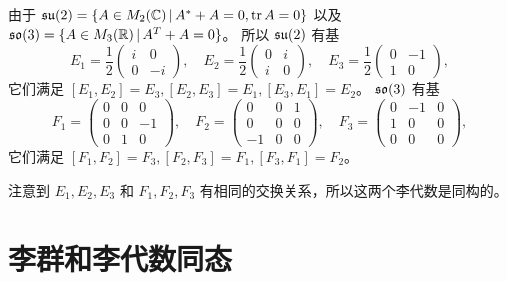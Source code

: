 \begin{example}\label{exa:base of su2 and so3}
  由于 $\mathfrak{su}(2)=\{A\in M_2(\mathbb C)\,|\, A^*+A=0,\operatorname{tr} A=0\}$
  以及 $\mathfrak{so}(3)=\{A\in M_3(\mathbb R)\,|\, A^T+A=0\}$。
  所以 $\mathfrak{su}(2)$ 有基
  \[
    E_1=\frac{1}{2}\begin{pmatrix}
      i & 0 \\
      0 & -i
    \end{pmatrix},\quad
    E_2=\frac{1}{2}\begin{pmatrix}
      0 & i \\
      i & 0
    \end{pmatrix},\quad
    E_3=\frac{1}{2}\begin{pmatrix}
      0 & -1 \\
      1 & 0
    \end{pmatrix},
  \]
  它们满足 $[E_1,E_2]=E_3,[E_2,E_3]=E_1,[E_3,E_1]=E_2$。
  $\mathfrak{so}(3)$ 有基
  \[
    F_1=\begin{pmatrix}
      0 & 0 & 0 \\
      0 & 0 & -1 \\
      0& 1 & 0
    \end{pmatrix},\quad
    F_2=\begin{pmatrix}
      0 & 0 & 1 \\
      0 & 0 & 0 \\
      -1 & 0 & 0 
    \end{pmatrix},\quad
    F_3=\begin{pmatrix}
      0 & -1 & 0\\
      1 & 0 & 0 \\
      0 & 0 & 0
    \end{pmatrix},
  \]
  它们满足 $[F_1,F_2]=F_3,[F_2,F_3]=F_1,[F_3,F_1]=F_2$。

  注意到 $E_1,E_2,E_3$ 和 $F_1,F_2,F_3$ 有相同的交换关系，所以这两个李代数是同构的。
\end{example}

\section{李群和李代数同态}

